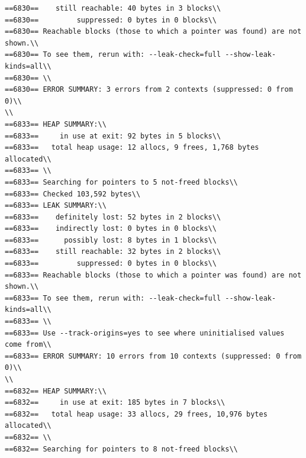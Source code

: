 \documentclass[a4paper,12pt]{report}
\begin{document}
\begin{verbatim}
==6830==    still reachable: 40 bytes in 3 blocks\\
==6830==         suppressed: 0 bytes in 0 blocks\\
==6830== Reachable blocks (those to which a pointer was found) are not shown.\\
==6830== To see them, rerun with: --leak-check=full --show-leak-kinds=all\\
==6830== \\
==6830== ERROR SUMMARY: 3 errors from 2 contexts (suppressed: 0 from 0)\\
\\
==6833== HEAP SUMMARY:\\
==6833==     in use at exit: 92 bytes in 5 blocks\\
==6833==   total heap usage: 12 allocs, 9 frees, 1,768 bytes allocated\\
==6833== \\
==6833== Searching for pointers to 5 not-freed blocks\\
==6833== Checked 103,592 bytes\\
==6833== LEAK SUMMARY:\\
==6833==    definitely lost: 52 bytes in 2 blocks\\
==6833==    indirectly lost: 0 bytes in 0 blocks\\
==6833==      possibly lost: 8 bytes in 1 blocks\\
==6833==    still reachable: 32 bytes in 2 blocks\\
==6833==         suppressed: 0 bytes in 0 blocks\\
==6833== Reachable blocks (those to which a pointer was found) are not shown.\\
==6833== To see them, rerun with: --leak-check=full --show-leak-kinds=all\\
==6833== \\
==6833== Use --track-origins=yes to see where uninitialised values come from\\
==6833== ERROR SUMMARY: 10 errors from 10 contexts (suppressed: 0 from 0)\\
\\
==6832== HEAP SUMMARY:\\
==6832==     in use at exit: 185 bytes in 7 blocks\\
==6832==   total heap usage: 33 allocs, 29 frees, 10,976 bytes allocated\\
==6832== \\
==6832== Searching for pointers to 8 not-freed blocks\\

\end{verbatim}
\end{document}
